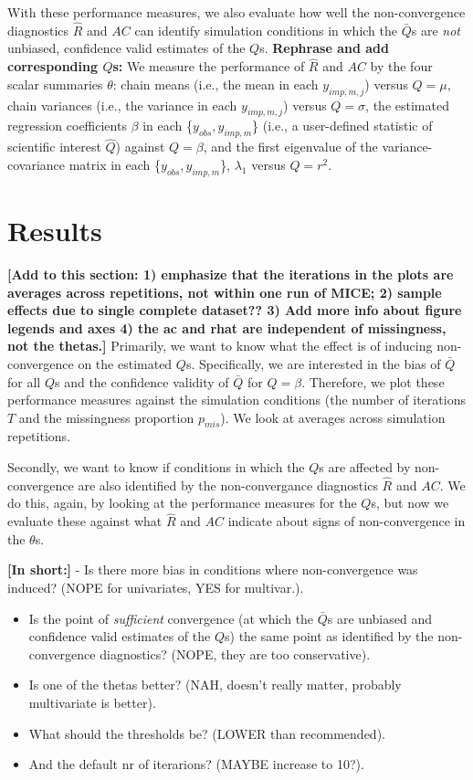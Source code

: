 \documentclass[Royal,times,sageh]{sagej}
\begin{document}
With these performance measures, we also evaluate how well the non-convergence diagnostics \(\widehat{R}\) and \(AC\) can identify simulation conditions in which the \(\bar{Q}\)s are \emph{not} unbiased, confidence valid estimates of the \(Q\)s. \textbf{Rephrase and add corresponding \(Q\)s:} We measure the performance of \(\widehat{R}\) and \(AC\) by the four scalar summaries \(\theta\): chain means (i.e., the mean in each \(y_{imp, m, j}\)) versus \(Q=\mu\), chain variances (i.e., the variance in each \(y_{imp, m, j}\)) versus \(Q=\sigma\), the estimated regression coefficients \(\beta\) in each \{\(y_{obs}, y_{imp, m}\)\} (i.e., a user-defined statistic of scientific interest \(\hat{Q}\)) against \(Q=\beta\), and the first eigenvalue of the variance-covariance matrix in each \{\(y_{obs}, y_{imp, m}\)\}, \(\lambda_1\) versus \(Q=r^2\).

\hypertarget{results}{%
\section{Results}\label{results}}

\textbf{{[}Add to this section: 1) emphasize that the iterations in the plots are averages across repetitions, not within one run of MICE; 2) sample effects due to single complete dataset?? 3) Add more info about figure legends and axes 4) the ac and rhat are independent of missingness, not the thetas.{]}}
Primarily, we want to know what the effect is of inducing non-convergence on the estimated \(Q\)s. Specifically, we are interested in the bias of \(\bar{Q}\) for all \(Q\)s and the confidence validity of \(\bar{Q}\) for \(Q=\beta\). Therefore, we plot these performance measures against the simulation conditions (the number of iterations \(T\) and the missingness proportion \(p_{mis}\)). We look at averages across simulation repetitions.

Secondly, we want to know if conditions in which the \(Q\)s are affected by non-convergence are also identified by the non-convergance diagnostics \(\widehat{R}\) and \(AC\). We do this, again, by looking at the performance measures for the \(Q\)s, but now we evaluate these against what \(\widehat{R}\) and \(AC\) indicate about signs of non-convergence in the \(\theta\)s.

\textbf{{[}In short:{]}}
- Is there more bias in conditions where non-convergence was induced? (NOPE for univariates, YES for multivar.).

\begin{itemize}
\item
  Is the point of \emph{sufficient} convergence (at which the \(\bar{Q}\)s are unbiased and confidence valid estimates of the \(Q\)s) the same point as identified by the non-convergence diagnostics? (NOPE, they are too conservative).
\item
  Is one of the thetas better? (NAH, doesn't really matter, probably multivariate is better).
\item
  What should the thresholds be? (LOWER than recommended).
\item
  And the default nr of iterarions? (MAYBE increase to 10?).
\end{itemize}
\end{document}
